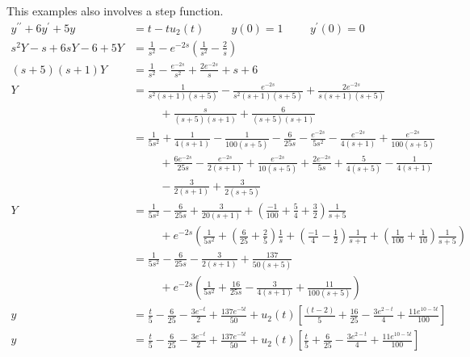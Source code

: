 \documentclass[fleqn,letterpaper]{report}
\begin{document}
\begin{example}
This examples also involves a step function.
\begin{align*}
y^{\prime \prime} + 6y^\prime + 5y & = t - tu_2(t) \hspace{1cm}
y(0) = 1 \hspace{1cm} y^\prime(0) = 0 \\
s^2 Y - s + 6sY - 6 + 5Y & = \frac{1}{s^2} - e^{-2s} \left(
\frac{1}{s^2} - \frac{2}{s} \right) \\
(s+5)(s+1) Y & = \frac{1}{s^2} - \frac{e^{-2s}}{s^2} +
\frac{2e^{-2s}}{s} + s + 6 \\
Y & = \frac{1}{s^2(s+1)(s+5)} - \frac{e^{-2s}}{s^2(s+1)(s+5)} +
\frac{2e^{-2s}}{s(s+1)(s+5)} \\
& \hspace{1cm} + \frac{s}{(s+5)(s+1)} +
\frac{6}{(s+5)(s+1)} \\
& = \frac{1}{5s^2} + \frac{1}{4(s+1)} - \frac{1}{100(s+5)} -
\frac{6}{25s} - \frac{e^{-2s}}{5s^2} - \frac{e^{-2s}}{4(s+1)} +
\frac{e^{-2s}}{100(s+5)} \\
& \hspace{1cm} + \frac{6e^{-2s}}{25s} -
\frac{e^{-2s}}{2(s+1)} + \frac{e^{-2s}}{10(s+5)} +
\frac{2e^{-2s}}{5s} + \frac{5}{4(s+5)} - \frac{1}{4(s+1)} \\
& \hspace{1cm} - \frac{3}{2(s+1)} + \frac{3}{2(s+5)} \\
Y & = \frac{1}{5s^2} - \frac{6}{25s} + \frac{3}{20(s+1)} +
\left( \frac{-1}{100} + \frac{5}{4} + \frac{3}{2} \right)
\frac{1}{s+5} \\
& \hspace{1cm} + e^{-2s} \left( \frac{1}{5s^2} + \left(
\frac{6}{25} + \frac{2}{5} \right) \frac{1}{s} + \left(
\frac{-1}{4} - \frac{1}{2} \right) \frac{1}{s+1} +
\left(\frac{1}{100} + \frac{1}{10} \right) \frac{1}{s+5} \right)
\\
& = \frac{1}{5s^2} - \frac{6}{25s} - \frac{3}{2(s+1)} +
\frac{137}{50(s+5)} \\
& \hspace{1cm} + e^{-2s} \left( \frac{1}{5s^2} +
\frac{16}{25s} - \frac{3}{4(s+1)} + \frac{11}{100(s+5)} \right) \\
y & = \frac{t}{5} - \frac{6}{25} - \frac{3e^{-t}}{2} +
\frac{137e^{-5t}}{50} + u_2(t) \left[ \frac{(t-2)}{5} +
\frac{16}{25} - \frac{3e^{2-t}}{4} + \frac{11e^{10-5t}}{100}
\right] \\
y & = \frac{t}{5} - \frac{6}{25} - \frac{3e^{-t}}{2} +
\frac{137e^{-5t}}{50} + u_2(t) \left[ \frac{t}{5} +
\frac{6}{25} - \frac{3e^{2-t}}{4} + \frac{11e^{10-5t}}{100}
\right] 
\end{align*}
\end{example}
\end{document}
